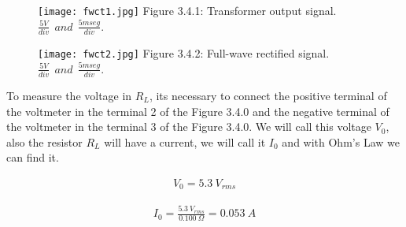 \begin{multicols}{2}
\begin{figure}[H]
\texttt{[image: fwct1.jpg]}
\centering \linebreak \linebreak Figure 3.4.1: Transformer output signal.
\linebreak \linebreak $\frac{5 V}{div}\ \ and\ \ \frac{5mseg}{div}$.
\end{figure}

\begin{figure}[H]
\texttt{[image: fwct2.jpg]}
\centering \linebreak \linebreak Figure 3.4.2: Full-wave rectified signal.
\linebreak \linebreak $\frac{5 V}{div}\ \ and\ \ \frac{5mseg}{div}$.
\end{figure}
\end{multicols}

{\bfseries\itshape\color{OliveGreen}{Observation:}} {\bfseries\itshape\color{OliveGreen}{In the oscilloscope we are only using the channel 1 in D.C option.}}  \hfill \break

To measure the voltage in {\bfseries\itshape $R_{L}$}, its necessary to connect the positive terminal of the voltmeter in the terminal 2 of the Figure 3.4.0 and the negative terminal of the voltmeter in the terminal 3 of the Figure 3.4.0. We will call this voltage $V_{0}$, also the resistor $R_{L}$ will have a current, we will call it $I_{0}$ and with Ohm's Law we can find it.

\begin{ceqn}
\begin{align}
V_{0} = 5.3\ V_{rms} 
\end{align}
\end{ceqn} \hfill

{\bfseries\itshape\color{OliveGreen}{Observation:}} {\bfseries\itshape{}} \hfill \break \break

{\bfseries\itshape{}} \hfill \break

\begin{ceqn}
\begin{align}
I_{0} = \frac{5.3\ V_{rms}}{0.100\ \Omega} = 0.053\ A
\end{align}
\end{ceqn} \hfill 

